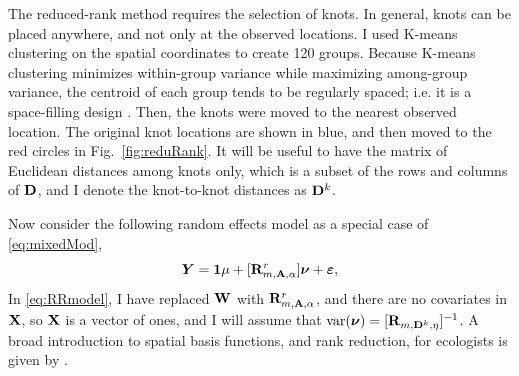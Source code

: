 \documentclass[11pt, titlepage]{article}\usepackage[]{graphicx}\usepackage[]{color}
\begin{document}
\begin{spacing}{1.9}
\begin{flushleft}
The reduced-rank method requires the selection of knots.  In general, knots can be placed anywhere, and not only at the observed locations.  I used K-means clustering \citep{MacQ:some:1967} on the spatial coordinates to create 120 groups. Because K-means clustering minimizes within-group variance while maximizing among-group variance, the centroid of each group tends to be regularly spaced; i.e. it is a space-filling design \citep[e.g.][]{Ver:Jans:esti:2015}.  Then, the knots were moved to the nearest observed location. The original knot locations are shown in blue, and then moved to the red circles in Fig.~\ref{fig:reduRank}.  It will be useful to have the matrix of Euclidean distances among knots only, which is a subset of the rows and columns of $\mathbf{D}$, and I denote the knot-to-knot distances as $\mathbf{D}^k$. 

Now consider the following random effects model as a special case of \ref{eq:mixedMod},
\begin{equation} \label{eq:RRmodel}
	\bm Y = \mathbf{1}\mu + [\mathbf{R}^r_{m,\mathbf{A},\alpha}]\mbox{\boldmath $\nu$} + \mbox{\boldmath $\varepsilon$},
\end{equation}
In \ref{eq:RRmodel}, I have replaced $\mathbf{W}$ with $\mathbf{R}_{m,\mathbf{A},\alpha}^r$, and there are no covariates in $\mathbf{X}$, so $\mathbf{X}$ is a vector of ones, and I will assume that $\textrm{var}(\mbox{\boldmath $\nu$})=[\mathbf{R}_{m,\mathbf{D}^k,\eta}]^{-1}$.  A broad introduction to spatial basis functions, and rank reduction, for ecologists is given by \citet{Hefl:Brom:Bros:Bude:basi:2016}.


\end{flushleft}
\end{spacing}
\end{document}
